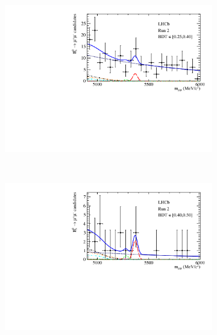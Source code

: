 {{\begin{figure}[htbp]
    \begin{subfigure}[b]{0.48\textwidth}
        \includegraphics[width=\textwidth]{./Figs/BFAnalysis/Bsmumu_Fit_Run2_bin2.pdf}
    \end{subfigure}
    ~ %
    \begin{subfigure}[b]{0.48\textwidth}
       \includegraphics[width=\textwidth]{./Figs/BFAnalysis/Bsmumu_Fit_Run2_bin3.pdf}
    \end{subfigure}
    \begin{subfigure}[b]{0.48\textwidth}

\end{subfigure}
\end{figure}}}
